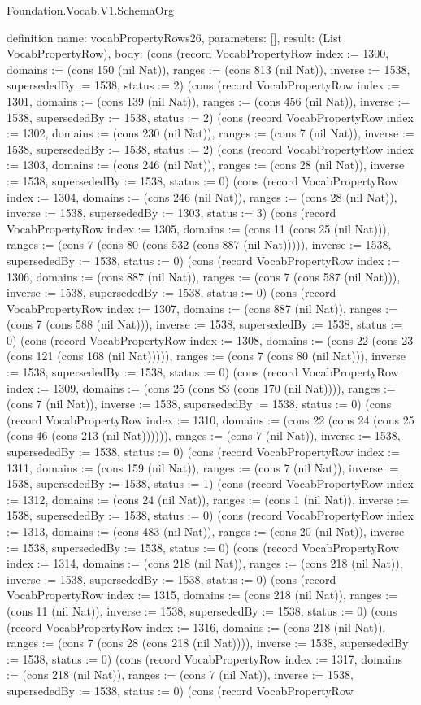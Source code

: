 \begin{lexlean}{Foundation.Vocab.V1.SchemaOrg}
\begin{semanticmodule}
definition{
  name: vocabPropertyRows26,
  parameters: [],
  result: (List VocabPropertyRow),
  body: (cons (record VocabPropertyRow {index := 1300, domains := (cons 150 (nil Nat)), ranges := (cons 813 (nil Nat)), inverse := 1538, supersededBy := 1538, status := 2}) (cons (record VocabPropertyRow {index := 1301, domains := (cons 139 (nil Nat)), ranges := (cons 456 (nil Nat)), inverse := 1538, supersededBy := 1538, status := 2}) (cons (record VocabPropertyRow {index := 1302, domains := (cons 230 (nil Nat)), ranges := (cons 7 (nil Nat)), inverse := 1538, supersededBy := 1538, status := 2}) (cons (record VocabPropertyRow {index := 1303, domains := (cons 246 (nil Nat)), ranges := (cons 28 (nil Nat)), inverse := 1538, supersededBy := 1538, status := 0}) (cons (record VocabPropertyRow {index := 1304, domains := (cons 246 (nil Nat)), ranges := (cons 28 (nil Nat)), inverse := 1538, supersededBy := 1303, status := 3}) (cons (record VocabPropertyRow {index := 1305, domains := (cons 11 (cons 25 (nil Nat))), ranges := (cons 7 (cons 80 (cons 532 (cons 887 (nil Nat))))), inverse := 1538, supersededBy := 1538, status := 0}) (cons (record VocabPropertyRow {index := 1306, domains := (cons 887 (nil Nat)), ranges := (cons 7 (cons 587 (nil Nat))), inverse := 1538, supersededBy := 1538, status := 0}) (cons (record VocabPropertyRow {index := 1307, domains := (cons 887 (nil Nat)), ranges := (cons 7 (cons 588 (nil Nat))), inverse := 1538, supersededBy := 1538, status := 0}) (cons (record VocabPropertyRow {index := 1308, domains := (cons 22 (cons 23 (cons 121 (cons 168 (nil Nat))))), ranges := (cons 7 (cons 80 (nil Nat))), inverse := 1538, supersededBy := 1538, status := 0}) (cons (record VocabPropertyRow {index := 1309, domains := (cons 25 (cons 83 (cons 170 (nil Nat)))), ranges := (cons 7 (nil Nat)), inverse := 1538, supersededBy := 1538, status := 0}) (cons (record VocabPropertyRow {index := 1310, domains := (cons 22 (cons 24 (cons 25 (cons 46 (cons 213 (nil Nat)))))), ranges := (cons 7 (nil Nat)), inverse := 1538, supersededBy := 1538, status := 0}) (cons (record VocabPropertyRow {index := 1311, domains := (cons 159 (nil Nat)), ranges := (cons 7 (nil Nat)), inverse := 1538, supersededBy := 1538, status := 1}) (cons (record VocabPropertyRow {index := 1312, domains := (cons 24 (nil Nat)), ranges := (cons 1 (nil Nat)), inverse := 1538, supersededBy := 1538, status := 0}) (cons (record VocabPropertyRow {index := 1313, domains := (cons 483 (nil Nat)), ranges := (cons 20 (nil Nat)), inverse := 1538, supersededBy := 1538, status := 0}) (cons (record VocabPropertyRow {index := 1314, domains := (cons 218 (nil Nat)), ranges := (cons 218 (nil Nat)), inverse := 1538, supersededBy := 1538, status := 0}) (cons (record VocabPropertyRow {index := 1315, domains := (cons 218 (nil Nat)), ranges := (cons 11 (nil Nat)), inverse := 1538, supersededBy := 1538, status := 0}) (cons (record VocabPropertyRow {index := 1316, domains := (cons 218 (nil Nat)), ranges := (cons 7 (cons 28 (cons 218 (nil Nat)))), inverse := 1538, supersededBy := 1538, status := 0}) (cons (record VocabPropertyRow {index := 1317, domains := (cons 218 (nil Nat)), ranges := (cons 7 (nil Nat)), inverse := 1538, supersededBy := 1538, status := 0}) (cons (record VocabPropertyRow }
\end{semanticmodule}
\end{lexlean}
